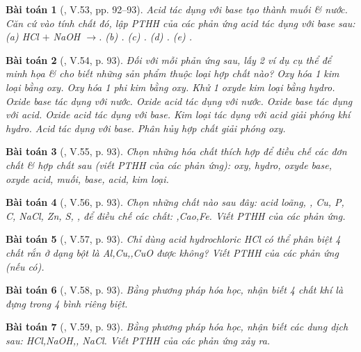 \documentclass{article}
\newtheorem{baitoan}{Bài toán}
\begin{document}
\begin{baitoan}[\cite{Truong_BTNC_Hoa_Hoc_8_2022}, V.53, pp. 92--93]
	Acid tác dụng với base tạo thành muối \& nước. Căn cứ vào tính chất đó, lập PTHH của các phản ứng acid tác dụng với base sau: (a) \emph{HCl $+$ NaOH} $\to$. (b) \emph{}. (c) \emph{}. (d) \emph{}. (e) \emph{}.
\end{baitoan}

\begin{baitoan}[\cite{Truong_BTNC_Hoa_Hoc_8_2022}, V.54, p. 93]
	Đối với mỗi phản ứng sau, lấy 2 ví dụ cụ thể để minh họa \& cho biết những sản phẩm thuộc loại hợp chất nào? Oxy hóa 1 kim loại bằng oxy. Oxy hóa 1 phi kim bằng oxy. Khử 1 oxyde kim loại bằng hydro. Oxide base tác dụng với nước. Oxide acid tác dụng với nước. Oxide base tác dụng với acid. Oxide acid tác dụng với base. Kim loại tác dụng với acid giải phóng khí hydro. Acid tác dụng với base. Phân hủy hợp chất giải phóng oxy.
\end{baitoan}

\begin{baitoan}[\cite{Truong_BTNC_Hoa_Hoc_8_2022}, V.55, p. 93]
	Chọn những hóa chất thích hợp để điều chế các đơn chất \& hợp chất sau (viết PTHH của các phản ứng): oxy, hydro, oxyde base, oxyde acid, muối, base, acid, kim loại.
\end{baitoan}

\begin{baitoan}[\cite{Truong_BTNC_Hoa_Hoc_8_2022}, V.56, p. 93]
	Chọn những chất nào sau đây: acid \emph{} loãng, \emph{, Cu, P, C, NaCl, Zn, S, , } để điều chế các chất: \emph{,Cao,Fe}. Viết PTHH của các phản ứng.
\end{baitoan}

\begin{baitoan}[\cite{Truong_BTNC_Hoa_Hoc_8_2022}, V.57, p. 93]
	Chỉ dùng acid hydrochloric \emph{HCl} có thể phân biệt 4 chất rắn ở dạng bột là \emph{Al,Cu,,CuO} được không? Viết PTHH của các phản ứng (nếu có).
\end{baitoan}

\begin{baitoan}[\cite{Truong_BTNC_Hoa_Hoc_8_2022}, V.58, p. 93]
	Bằng phương pháp hóa học, nhận biết 4 chất khí là \emph{} đựng trong 4 bình riêng biệt.
\end{baitoan}

\begin{baitoan}[\cite{Truong_BTNC_Hoa_Hoc_8_2022}, V.59, p. 93]
	Bằng phương pháp hóa học, nhận biết các dung dịch sau: \emph{HCl,NaOH,, NaCl}. Viết PTHH của các phản ứng xảy ra.
\end{baitoan}
\end{document}
